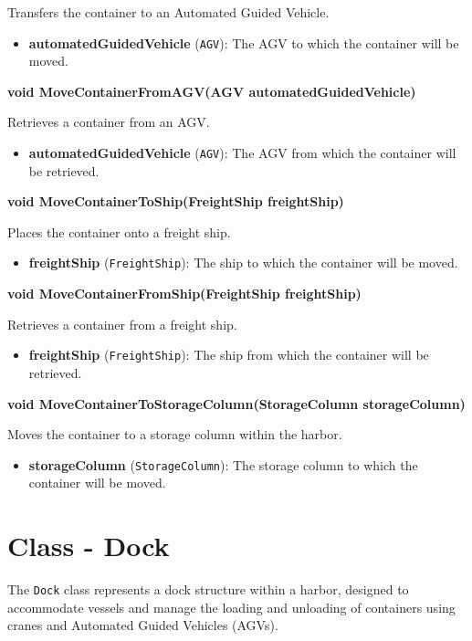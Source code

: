\documentclass[12pt]{article}
\begin{document}
Transfers the container to an Automated Guided Vehicle.

\begin{itemize}
    \item \textbf{automatedGuidedVehicle} (\texttt{AGV}): The AGV to which the container will be moved.
\end{itemize}

\textbf{void MoveContainerFromAGV(AGV automatedGuidedVehicle)}

Retrieves a container from an AGV.

\begin{itemize}
    \item \textbf{automatedGuidedVehicle} (\texttt{AGV}): The AGV from which the container will be retrieved.
\end{itemize}

\textbf{void MoveContainerToShip(FreightShip freightShip)}

Places the container onto a freight ship.

\begin{itemize}
    \item \textbf{freightShip} (\texttt{FreightShip}): The ship to which the container will be moved.
\end{itemize}

\textbf{void MoveContainerFromShip(FreightShip freightShip)}

Retrieves a container from a freight ship.

\begin{itemize}
    \item \textbf{freightShip} (\texttt{FreightShip}): The ship from which the container will be retrieved.
\end{itemize}

\textbf{void MoveContainerToStorageColumn(StorageColumn storageColumn)}

Moves the container to a storage column within the harbor.

\begin{itemize}
    \item \textbf{storageColumn} (\texttt{StorageColumn}): The storage column to which the container will be moved.
\end{itemize}

\newpage
\section*{Class - Dock}

The \texttt{Dock} class represents a dock structure within a harbor, designed to accommodate vessels and manage the loading and unloading of containers using cranes and Automated Guided Vehicles (AGVs).
\end{document}
